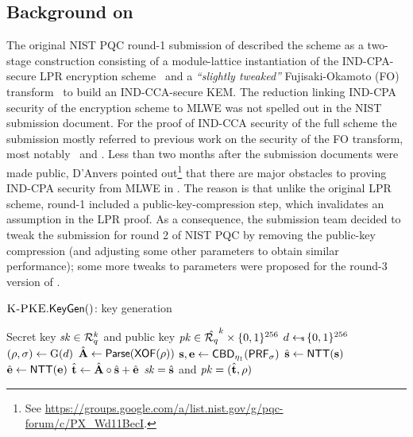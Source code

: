 \subsection{Background on \mlkem}
\label{sec:kyber_to_mlkem}

The original NIST PQC round-1 submission of
\kyber described the scheme as a two-stage construction consisting of
a module-lattice instantiation of the IND-CPA-secure LPR encryption
scheme~\cite{EC:LyuPeiReg10,Eurocrypt2010PeikertSlides} and a
\emph{``slightly tweaked''} Fujisaki-Okamoto (FO) transform~\cite{C:FujOka99,JC:FujOka13} 
to build an IND-CCA-secure KEM. 
The reduction linking IND-CPA security of the encryption scheme to MLWE 
was not spelled out in the NIST submission document.  
For the proof of IND-CCA security of the full scheme the
submission mostly referred to previous work on the security of the FO
transform, most notably~\cite{TCC:HofHovKil17} and \cite{EPRINT:SaiXagYam17}.
Less than two months after the submission documents were made public,
D'Anvers pointed out\footnote{See \url{https://groups.google.com/a/list.nist.gov/g/pqc-forum/c/PX_Wd11BecI}.}
that there are major obstacles to
proving IND-CPA security from MLWE in \kyber.  The reason is that
unlike the original LPR scheme, round-1 \kyber included a
public-key-compression step, which invalidates an assumption in the
LPR proof. As a consequence, the \kyber submission team decided to
tweak the submission for round 2 of NIST PQC by removing the
public-key compression (and adjusting some other parameters to obtain
similar performance); some more tweaks to parameters were proposed for
the round-3 version of \kyber.

\begin{algorithm}[tb]
  \caption{$\text{{\sc K-PKE}}.\mathsf{KeyGen}()$: key generation}
  \label{alg:gen}
  \begin{algorithmic}[1]
    \Ensure Secret key $\mathit{sk} \in \mathcal{R}_q^k$ and public key $\mathit{pk} \in \hat{\mathcal{R}_q}^k \times \{0,1\}^{256}$
    \State $d \leftarrow \!\!\! \mbox{\tiny \$}\, \{0,1\}^{256}$
    \State $(\rho,\sigma) \gets \text{G}(d)$
    \State $\hat{\mathbf{A}} \gets \mathsf{Parse}(\mathsf{XOF}(\rho))$
    \State $\mathbf{s}, \mathbf{e} \gets \mathsf{CBD}_{\eta_1}(\mathsf{PRF}_\sigma)$ 
    \State $\hat{\mathbf{s}} \gets \mbox{\textsf{NTT}}(\mathbf{s})$
    \State $\hat{\mathbf{e}} \gets \mbox{\textsf{NTT}}(\mathbf{e})$
    \State $\hat{\mathbf{t}} \gets \hat{\mathbf{A}} \circ \hat{\mathbf{s}} + \hat{\mathbf{e}}$
    \State \Return $\mathit{sk} = \hat{\mathbf{s}}$ and $\mathit{pk}=(\hat{\mathbf{t}},\rho)$
  \end{algorithmic}
\end{algorithm}

